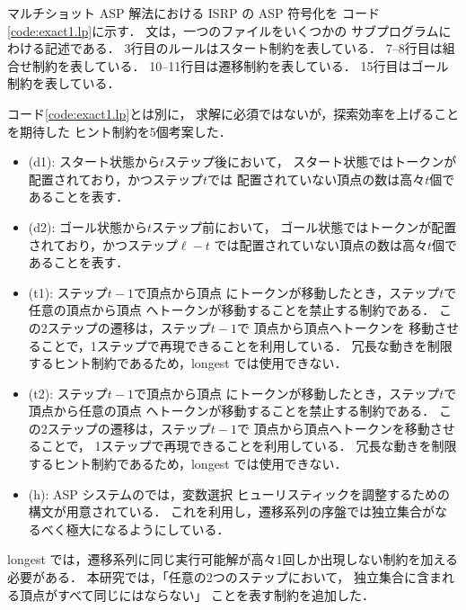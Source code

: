 マルチショット ASP 解法における ISRP の ASP 符号化を
コード\ref{code:exact1.lp}に示す．
文は，一つのファイルをいくつかの
サブプログラムにわける記述である．
3行目のルールはスタート制約を表している．
7--8行目は組合せ制約を表している．
10--11行目は遷移制約を表している．
15行目はゴール制約を表している．

コード\ref{code:exact1.lp}とは別に，
求解に必須ではないが，探索効率を上げることを期待した
ヒント制約を5個考案した．
\begin{itemize}
  \item {} (d1): スタート状態から$t$ステップ後において，
    スタート状態ではトークンが配置されており，かつステップ$t$では
    配置されていない頂点の数は高々$t$個であることを表す．
  \item {} (d2): ゴール状態から$t$ステップ前において，
    ゴール状態ではトークンが配置されており，かつステップ$\ell-t$
    では配置されていない頂点の数は高々$t$個であることを表す．
  \item {} (t1): ステップ$t-1$で頂点から頂点
    にトークンが移動したとき，ステップ$t$で任意の頂点から頂点
    へトークンが移動することを禁止する制約である．
    この2ステップの遷移は，ステップ$t-1$で
    頂点から頂点へトークンを
    移動させることで，1ステップで再現できることを利用している．
    冗長な動きを制限するヒント制約であるため，longest では使用できない．
  \item {} (t2): ステップ$t-1$で頂点から頂点
    にトークンが移動したとき，ステップ$t$で頂点から任意の頂点
    へトークンが移動することを禁止する制約である．
    この2ステップの遷移は，ステップ$t-1$で
    頂点から頂点へトークンを移動させることで，
    1ステップで再現できることを利用している．
    冗長な動きを制限するヒント制約であるため，longest では使用できない．
  \item {} (h): ASP システムの{\clingo}では，変数選択
    ヒューリスティックを調整するための構文が用意されている．
    これを利用し，遷移系列の序盤では独立集合がなるべく極大になるようにしている．
\end{itemize}

longest では，遷移系列に同じ実行可能解が高々1回しか出現しない制約を加える
必要がある．
本研究では，「任意の2つのステップにおいて，
独立集合に含まれる頂点がすべて同じにはならない」
ことを表す制約を追加した．
